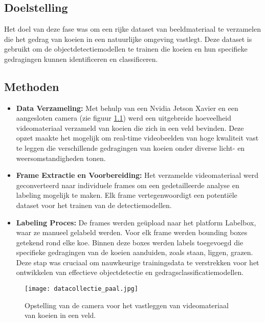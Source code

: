 \chapter{}%
\label{ch:datacollectie}

\section{Doelstelling}
Het doel van deze fase was om een rijke dataset van beeldmateriaal te verzamelen die het gedrag van koeien in een natuurlijke omgeving vastlegt. Deze dataset is gebruikt om de objectdetectiemodellen te trainen die koeien en hun specifieke gedragingen kunnen identificeren en classificeren.


\section{Methoden}
\begin{itemize}
  \item \textbf{Data Verzameling:}  Met behulp van een Nvidia Jetson Xavier en een aangesloten camera (zie figuur \ref{fig:datacollectie_paal}) werd een uitgebreide hoeveelheid videomateriaal verzameld van koeien die zich in een veld bevinden. Deze opzet maakte het mogelijk om real-time videobeelden van hoge kwaliteit vast te leggen die verschillende gedragingen van koeien onder diverse licht- en weersomstandigheden tonen.
  \item \textbf{Frame Extractie en Voorbereiding:} Het verzamelde videomateriaal werd geconverteerd naar individuele frames om een gedetailleerde analyse en labeling mogelijk te maken. Elk frame vertegenwoordigt een potentiële dataset voor het trainen van de detectiemodellen.
  \item \textbf{Labeling Proces:} De frames werden geüpload naar het platform Labelbox, waar ze manueel gelabeld werden. Voor elk frame werden bounding boxes getekend rond elke koe. Binnen deze boxes werden labels toegevoegd die specifieke gedragingen van de koeien aanduiden, zoals staan, liggen, grazen. Deze stap was cruciaal om nauwkeurige trainingsdata te verstrekken voor het ontwikkelen van effectieve objectdetectie en gedragsclassificatiemodellen.
\end{itemize}
\begin{figure}[H]
  \centering
  \texttt{[image: datacollectie\_paal.jpg]}
  \caption{Opstelling van de camera voor het vastleggen van videomateriaal van koeien in een veld.}
  \label{fig:datacollectie_paal}  
\end{figure}
